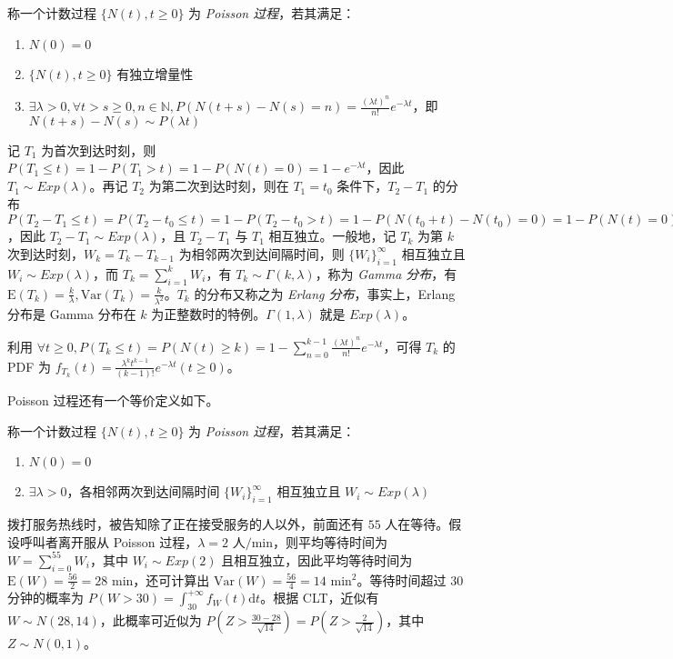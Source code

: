 \documentclass[../main.tex]{subfiles}
\begin{document}
\begin{definition}\label{def:6.1.4}
    称一个计数过程 $\{N(t),t\geq0\}$ 为 \emph{Poisson 过程}，若其满足：
    \begin{enumerate}
        \item $N(0)=0$
        \item $\{N(t),t\geq0\}$ 有独立增量性
        \item $\exists\lambda>0,\forall t>s\geq0,n\in\mathbb N,P(N(t+s)-N(s)=n)=\frac{(\lambda t)^n}{n!}e^{-\lambda t}$，即 $N(t+s)-N(s)\sim P(\lambda t)$
    \end{enumerate}
\end{definition}

记 $T_1$ 为首次到达时刻，则 $P(T_1\leq t)=1-P(T_1>t)=1-P(N(t)=0)=1-e^{-\lambda t}$，因此 $T_1\sim Exp(\lambda)$。再记 $T_2$ 为第二次到达时刻，则在 $T_1=t_0$ 条件下，$T_2-T_1$ 的分布 $P(T_2-T_1\leq t)=P(T_2-t_0\leq t)=1-P(T_2-t_0>t)=1-P(N(t_0+t)-N(t_0)=0)=1-P(N(t)=0)=1-e^{-\lambda t}$，因此 $T_2-T_1\sim Exp(\lambda)$，且 $T_2-T_1$ 与 $T_1$ 相互独立。一般地，记 $T_k$ 为第 $k$ 次到达时刻，$W_k=T_k-T_{k-1}$ 为相邻两次到达间隔时间，则 $\{W_i\}_{i=1}^\infty$ 相互独立且 $W_i\sim Exp(\lambda)$，而 $T_k=\sum_{i=1}^kW_i$，有 $T_k\sim \Gamma(k,\lambda)$，称为 \emph{Gamma 分布}，有 $\mathrm E(T_k)=\frac k\lambda,\mathrm{Var}(T_k)=\frac k{\lambda^2}$。$T_k$ 的分布又称之为 \emph{Erlang 分布}，事实上，Erlang 分布是 Gamma 分布在 $k$ 为正整数时的特例。$\Gamma(1,\lambda)$ 就是 $Exp(\lambda)$。

利用 $\forall t\geq0,P(T_k\leq t)=P(N(t)\geq k)=1-\sum_{n=0}^{k-1}\frac{(\lambda t)^n}{n!}e^{-\lambda t}$，可得 $T_k$ 的 PDF 为 $f_{T_k}(t)=\frac{\lambda^kt^{k-1}}{(k-1)!}e^{-\lambda t}(t\geq 0)$。

Poisson 过程还有一个等价定义如下。

\begin{definition}\label{def:6.1.5}
    称一个计数过程 $\{N(t),t\geq0\}$ 为 \emph{Poisson 过程}，若其满足：
    \begin{enumerate}
        \item $N(0)=0$
        \item $\exists\lambda>0$，各相邻两次到达间隔时间 $\{W_i\}_{i=1}^\infty$ 相互独立且 $W_i\sim Exp(\lambda)$
    \end{enumerate}
\end{definition}

\begin{example}
    拨打服务热线时，被告知除了正在接受服务的人以外，前面还有 $55$ 人在等待。假设呼叫者离开服从 Poisson 过程，$\lambda=2\text{ 人/min}$，则平均等待时间为 $W=\sum_{i=0}^{55}W_i$，其中 $W_i\sim Exp(2)$ 且相互独立，因此平均等待时间为 $\mathrm E(W)=\frac{56}{2}=28\text{ min}$，还可计算出 $\mathrm{Var}(W)=\frac{56}{4}=14\text{ min}^2$。等待时间超过 $30$ 分钟的概率为 $P(W>30)=\int_{30}^{+\infty}f_W(t)\mathrm dt$。根据 CLT，近似有 $W\sim N(28,14)$，此概率可近似为 $P(Z>\frac{30-28}{\sqrt{14}})=P(Z>\frac2{\sqrt{14}})$，其中 $Z\sim N(0,1)$。
\end{example}
\end{document}
